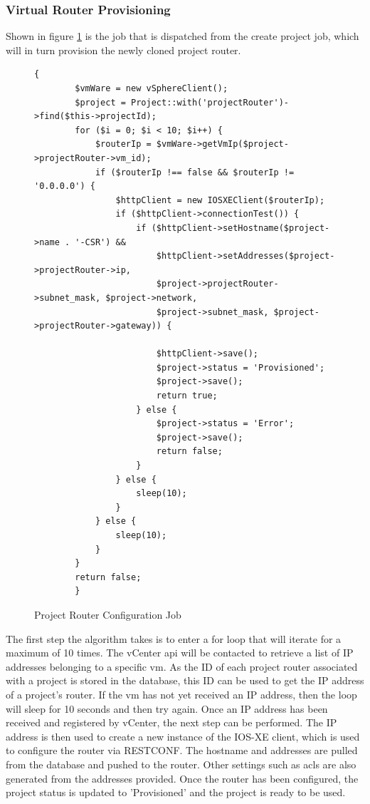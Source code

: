 \subsubsection{Virtual Router Provisioning}
Shown in figure \ref{fig:project-router-configuration-job} is the job that is dispatched from the create project job, which will in turn provision the newly cloned project router.
\begin{figure}[H]
    \begin{lstlisting}[basicstyle=\scriptsize]
        {
        $vmWare = new vSphereClient();
        $project = Project::with('projectRouter')->find($this->projectId);
        for ($i = 0; $i < 10; $i++) {
            $routerIp = $vmWare->getVmIp($project->projectRouter->vm_id);
            if ($routerIp !== false && $routerIp != '0.0.0.0') {
                $httpClient = new IOSXEClient($routerIp);
                if ($httpClient->connectionTest()) {
                    if ($httpClient->setHostname($project->name . '-CSR') &&
                        $httpClient->setAddresses($project->projectRouter->ip,
                        $project->projectRouter->subnet_mask, $project->network,
                        $project->subnet_mask, $project->projectRouter->gateway)) {

                        $httpClient->save();
                        $project->status = 'Provisioned';
                        $project->save();
                        return true;
                    } else {
                        $project->status = 'Error';
                        $project->save();
                        return false;
                    }
                } else {
                    sleep(10);
                }
            } else {
                sleep(10);
            }
        }
        return false;
        }
    \end{lstlisting}
    \caption{Project Router Configuration Job}
    \label{fig:project-router-configuration-job}
\end{figure}

The first step the algorithm takes is to enter a for loop that will iterate for a maximum of 10 times. The vCenter \gls{api} will be contacted to retrieve a list of IP addresses belonging to a specific \gls{vm}. As the ID of each project router associated with a project is stored in the database, this ID can be used to get the IP address of a project's router. If the \gls{vm} has not yet received an IP address, then the loop will sleep for 10 seconds and then try again. Once an IP address has been received and registered by vCenter, the next step can be performed. The IP address is then used to create a new instance of the IOS-XE client, which is used to configure the router via RESTCONF. The hostname and addresses are pulled from the database and pushed to the router. Other settings such as \gls{acl}s are also generated from the addresses provided. Once the router has been configured, the project status is updated to 'Provisioned' and the project is ready to be used.

